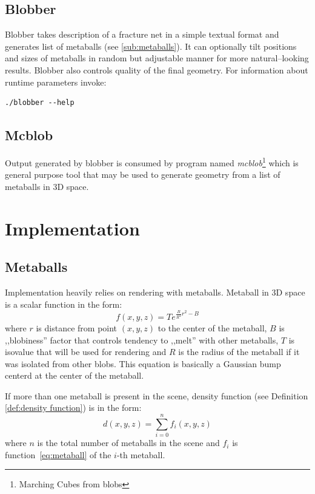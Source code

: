 \subsection{Blobber}
Blobber takes description of a fracture net in a simple textual format and
generates list of metaballs (see \autoref{sub:metaballs}). It can
optionally tilt positions and sizes of metaballs in random but adjustable manner
for more natural--looking results. Blobber also controls quality of the final
geometry. For information about runtime parameters invoke:
\begin{verbatim}
./blobber --help
\end{verbatim}

\subsection{Mcblob}
Output generated by blobber is consumed by program named \emph{mcblob}\footnote{Marching
Cubes from blobs} which is general purpose tool that may be used to
generate geometry from a list of metaballs in 3D space.

\section{Implementation}
\subsection{Metaballs}
Implementation heavily relies on rendering with metaballs. Metaball in 3D space
is a scalar function in the form:
\begin{equation}
  f(x,y,z)=Te^{\frac{B}{R^2}r^2 - B}
  \label{eq:metaball}
\end{equation}
where $r$ is distance from point $(x,y,z)$ to the center of the metaball, $B$ is
,,blobiness'' factor that controls tendency to ,,melt'' with other metaballs, $T$
is isovalue that will be used for rendering and $R$ is the radius of the
metaball if it was isolated from other blobs. This equation is basically a
Gaussian bump centerd at the center of the metaball.

If more than one metaball is present in the scene, density function (see Definition
\autoref{def:density function})
is in the form:
\begin{equation}
  d(x,y,z) = \sum_{i=0}^{n} f_i(x,y,z)
  \label{eq:metaballdensity}
\end{equation}
where $n$ is the total number of metaballs in the scene and $f_i$ is function~\ref{eq:metaball}
of the $i$-th metaball.

